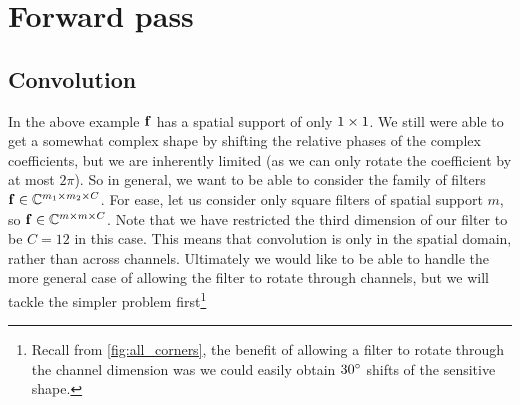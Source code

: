 \section{Forward pass}
\subsection{Convolution}
\renewcommand{\SigIn}{z}
\renewcommand{\SigOut}{w}
\renewcommand{\Filter}{f}
\renewcommand{\SigInB}{\bmu{\SigIn}}
\renewcommand{\SigOutB}{\bmu{\SigOut}}
\renewcommand{\FilterB}{\bmu{\Filter}}
  
In the above example $\FilterB$ has a spatial support of only $1\times 1$. We still
were able to get a somewhat complex shape by shifting the relative phases of
the complex coefficients, but we are inherently limited (as we can only
rotate the coefficient by at most $2\pi$). So in general, we want to be able
to consider the family of filters $\FilterB \in \complexes[m_1 \x m_2 \x C]$. For
ease, let us consider only square filters of spatial support $m$, so
$\FilterB \in \complexes[m\x m\x C]$. Note that we have restricted the third
dimension of our filter to be $C=12$ in this case. This means that convolution is
only in the spatial domain, rather than across channels. Ultimately we would
like to be able to handle the more general case of allowing the filter to
rotate through channels, but we will tackle the simpler problem 
first\footnote{Recall from \autoref{fig:all_corners}, the benefit of allowing
a filter to rotate through the channel dimension was we could easily obtain
$30^{\circ}$ shifts of the sensitive shape.}

